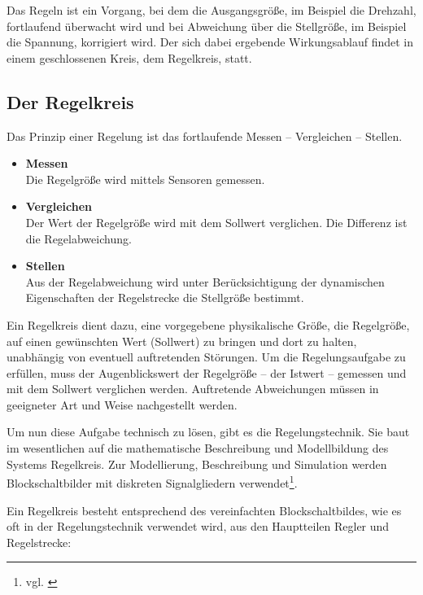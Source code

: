 {{Das Regeln ist ein Vorgang, bei dem die Ausgangsgröße, im Beispiel die Drehzahl, fortlaufend überwacht wird und bei Abweichung über die Stellgröße, im Beispiel die Spannung, korrigiert wird. Der sich dabei ergebende Wirkungsablauf findet in einem geschlossenen Kreis, dem Regelkreis, statt.
\vspace{5mm}

\subsection{Der Regelkreis}
Das Prinzip einer Regelung ist das fortlaufende Messen – Vergleichen – Stellen.
\\[5mm]

\begin{itemize}
	\item \textbf{Messen}
	\\[1mm] Die Regelgröße wird mittels Sensoren gemessen.
	\medskip
	\item \textbf{Vergleichen}
	\\[1mm] Der Wert der Regelgröße wird mit dem Sollwert verglichen. Die Differenz ist die Regelabweichung.
	\medskip
	\item \textbf{Stellen}
	\\[1mm] Aus der Regelabweichung wird unter Berücksichtigung der dynamischen Eigenschaften der Regelstrecke die Stellgröße bestimmt.
\end{itemize}
\vspace{3mm}

Ein Regelkreis dient dazu, eine vorgegebene physikalische Größe, die Regelgröße, auf einen gewünschten Wert (Sollwert) zu bringen und dort zu halten, unabhängig von eventuell auftretenden Störungen. Um die Regelungsaufgabe zu erfüllen, muss der Augenblickswert der Regelgröße – der Istwert – gemessen und mit dem Sollwert verglichen werden. Auftretende Abweichungen müssen in geeigneter Art und Weise nachgestellt werden.

Um nun diese Aufgabe technisch zu lösen, gibt es die Regelungstechnik. Sie baut im wesentlichen auf die mathematische Beschreibung und Modellbildung des Systems Regelkreis. Zur Modellierung, Beschreibung und Simulation werden Blockschaltbilder mit diskreten Signalgliedern verwendet\footnote{vgl. \cite{Regelungstechnik}}.
	
\newpage

Ein Regelkreis besteht entsprechend des vereinfachten Blockschaltbildes, wie es oft in der Regelungstechnik verwendet wird, aus den Hauptteilen Regler und Regelstrecke:
\\[5mm]

}}

